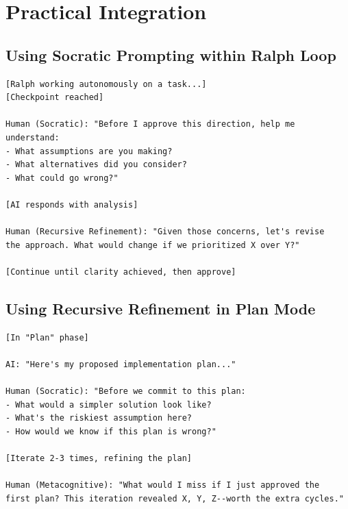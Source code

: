\chapter{Practical Integration}

\section{Using Socratic Prompting within Ralph Loop}

\begin{lstlisting}
[Ralph working autonomously on a task...]
[Checkpoint reached]

Human (Socratic): "Before I approve this direction, help me understand:
- What assumptions are you making?
- What alternatives did you consider?
- What could go wrong?"

[AI responds with analysis]

Human (Recursive Refinement): "Given those concerns, let's revise
the approach. What would change if we prioritized X over Y?"

[Continue until clarity achieved, then approve]
\end{lstlisting}

\section{Using Recursive Refinement in Plan Mode}

\begin{lstlisting}
[In "Plan" phase]

AI: "Here's my proposed implementation plan..."

Human (Socratic): "Before we commit to this plan:
- What would a simpler solution look like?
- What's the riskiest assumption here?
- How would we know if this plan is wrong?"

[Iterate 2-3 times, refining the plan]

Human (Metacognitive): "What would I miss if I just approved the
first plan? This iteration revealed X, Y, Z--worth the extra cycles."
\end{lstlisting}

